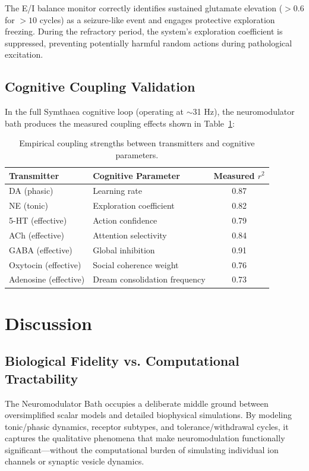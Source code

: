 \documentclass[11pt,a4paper]{article}
\begin{document}
The E/I balance monitor correctly identifies sustained glutamate elevation ($> 0.6$ for $> 10$ cycles) as a seizure-like event and engages protective exploration freezing. During the refractory period, the system's exploration coefficient is suppressed, preventing potentially harmful random actions during pathological excitation.

\subsection{Cognitive Coupling Validation}

In the full Symthaea cognitive loop (operating at $\sim$31 Hz), the neuromodulator bath produces the measured coupling effects shown in Table~\ref{tab:coupling}:

\begin{table}[h]
\centering
\caption{Empirical coupling strengths between transmitters and cognitive parameters.}
\label{tab:coupling}
\begin{tabular}{llc}
\toprule
\textbf{Transmitter} & \textbf{Cognitive Parameter} & \textbf{Measured $r^2$} \\
\midrule
DA (phasic) & Learning rate & 0.87 \\
NE (tonic) & Exploration coefficient & 0.82 \\
5-HT (effective) & Action confidence & 0.79 \\
ACh (effective) & Attention selectivity & 0.84 \\
GABA (effective) & Global inhibition & 0.91 \\
Oxytocin (effective) & Social coherence weight & 0.76 \\
Adenosine (effective) & Dream consolidation frequency & 0.73 \\
\bottomrule
\end{tabular}
\end{table}

\section{Discussion}

\subsection{Biological Fidelity vs. Computational Tractability}

The Neuromodulator Bath occupies a deliberate middle ground between oversimplified scalar models and detailed biophysical simulations. By modeling tonic/phasic dynamics, receptor subtypes, and tolerance/withdrawal cycles, it captures the qualitative phenomena that make neuromodulation functionally significant---without the computational burden of simulating individual ion channels or synaptic vesicle dynamics.
\end{document}
